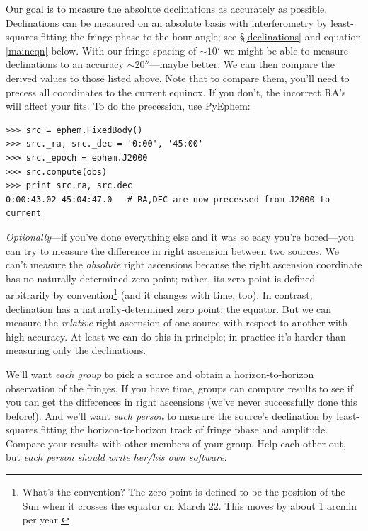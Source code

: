 \documentclass[11pt,preprint]{aastex}
\begin{document}
	Our goal is to measure the absolute declinations as accurately
as possible.  Declinations can be measured on an absolute basis with
interferometry by least-squares fitting the fringe phase to the hour
angle; see \S\ref{declinations} and equation \ref{maineqn} below.  With our
fringe spacing of $\sim 10'$ we might be able to measure declinations to
an accuracy $\sim 20''$---maybe better.  We can then compare the derived
values to those listed above.
Note that to compare them, you'll need to precess all coordinates
to the current equinox. If you don't, the incorrect RA's will affect
your fits. To do the precession, use PyEphem:
\begin{verbatim}
>>> src = ephem.FixedBody()
>>> src._ra, src._dec = '0:00', '45:00'
>>> src._epoch = ephem.J2000
>>> src.compute(obs)
>>> print src.ra, src.dec
0:00:43.02 45:04:47.0   # RA,DEC are now precessed from J2000 to current
\end{verbatim}

{\it Optionally}---if you've done everything else and it was so easy
you're bored---you can try to measure the difference in right ascension
between two sources.  We can't measure the {\it absolute} right
ascensions because the right ascension coordinate has no
naturally-determined zero point; rather, its zero point is defined
arbitrarily by convention\footnote{What's the convention? The zero point
is defined to be the position of the Sun when it crosses the equator on
March 22. This moves by about 1 arcmin per year.} (and it changes with
time, too).  In contrast, declination has a naturally-determined zero
point: the equator.  But we can measure the {\it relative} right
ascension of one source with respect to another with high accuracy.  At
least we can do this in principle; in practice it's harder than
measuring only the declinations.

	We'll want {\it each group} to pick a source and obtain a
horizon-to-horizon observation of the fringes. If you have time, groups
can compare results to see if you can get the differences in right
ascensions (we've never successfully done this before!). And we'll want
{\it each person} to measure the source's declination by least-squares
fitting the horizon-to-horizon track of fringe phase and amplitude.
Compare your results with other members of your group.  Help each other
out, but {\it each person should write her/his own software}.
\end{document}
